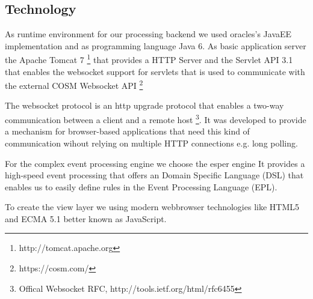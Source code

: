 \documentclass{acm_proc_article-sp}
\begin{document}
\subsection{Technology}
As runtime environment for our processing backend we used oracles's JavaEE implementation and as programming language Java 6. As basic application server the Apache Tomcat 7 \footnote{http://tomcat.apache.org} that provides a HTTP Server and the Servlet API 3.1 that enables the websocket support for servlets that is used to communicate with the external COSM Websocket API
\footnote{https://cosm.com/}

The websocket protocol is an http upgrade protocol that enables a two-way communication between a client and a remote host
\footnote{Offical Websocket RFC, http://tools.ietf.org/html/rfc6455}. It was developed to provide a mechanism for browser-based applications that need this kind of communication wihout relying on multiple HTTP connections e.g. long polling. 

For the complex event processing engine we choose the esper engine
It provides a high-speed event processing that offers an Domain Specific Language (DSL) that enables us to easily define rules in the Event Processing Language (EPL).

To create the view layer we using modern webbrowser technologies like HTML5 and ECMA 5.1 better known as JavaScript.
\end{document}
